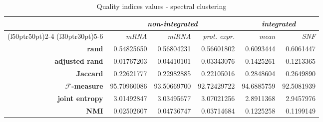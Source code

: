 \begin{table}
    \centering
    \begin{tabularx}{\linewidth}{rrrrrr}
         & \multicolumn{3}{c}{\textit{non-integrated}} & \multicolumn{2}{c}{\textit{integrated}} \\
         \cmidrule(l{50pt}r{50pt}){2-4} 
         \cmidrule(l{30pt}r{30pt}){5-6}
         & \textit{mRNA} & \textit{miRNA} & \textit{prot. expr.} & \textit{mean} & \textit{SNF}\\
        \midrule
        \textbf{rand} & 0.54825650 & 0.56804231 & 0.56601802 & 0.6093444 & 0.6061447\\
        \textbf{adjusted rand} & 0.01767203 & 0.04410101 & 0.03343076 & 0.1425261 & 0.1213365\\
        \textbf{Jaccard} & 0.22621777 & 0.22982885 & 0.22105016 & 0.2848604 & 0.2649890\\
        \textbf{$\mathcal{F}$-measure} & 95.70960086 & 93.50669700 & 92.72429722 & 94.6885759 & 92.5081939\\
        \textbf{joint entropy} & 3.01492847 & 3.03495677 & 3.07021256 & 2.8911368 & 2.9457976\\
        \textbf{NMI} & 0.02502607 & 0.04736747 & 0.03714684 & 0.1225258 & 0.1199149\\
        \bottomrule		
    \end{tabularx}
    \caption{Quality indices values - spectral clustering}\label{tab:indices_sc}
\end{table}

